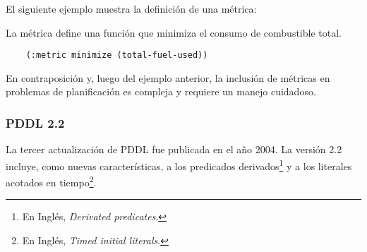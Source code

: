 \begin{itemize}
	El siguiente ejemplo muestra la definici\'on de una m\'etrica:

	\begin{ejemplo}
	
	La m\'etrica define una funci\'on que minimiza
	el consumo de combustible total.
	
	\begin{verbatim}
	(:metric minimize (total-fuel-used))
	\end{verbatim}
	\end{ejemplo}

        En contraposici\'on y, luego del ejemplo anterior, 
	la inclusi\'on de m\'etricas en problemas
	de planificaci\'on es compleja y requiere un manejo cuidadoso.

	\end{itemize}



\subsubsection{PDDL 2.2}

La tercer actualizaci\'on de PDDL fue publicada en el a\~{n}o 2004. 
La versi\'on 2.2 \cite{gbraun:pddl22} incluye, como nuevas
caracter\'isticas, a los predicados derivados\footnote{En Ingl\'es, \emph{Derivated
predicates}.} y a los literales acotados en 
tiempo\footnote{En Ingl\'es, \emph{Timed initial literals}.}. 

